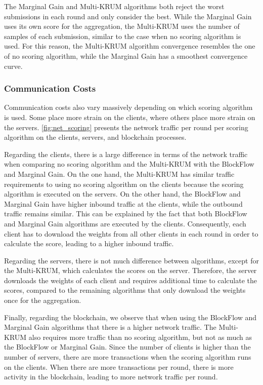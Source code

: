 The Marginal Gain and Multi-KRUM algorithms both reject the worst submissions in each round and only consider the best. While the Marginal Gain uses its own score for the aggregation, the Multi-KRUM uses the number of samples of each submission, similar to the case when no scoring algorithm is used. For this reason, the Multi-KRUM algorithm convergence resembles the one of no scoring algorithm, while the Marginal Gain has a smoothest convergence curve.

\subsubsection{Communication Costs}

Communication costs also vary massively depending on which  scoring algorithm is used. Some place more strain on the clients, where others place more strain on the servers. \autoref{fig:net_scoring} presents the network traffic per round per scoring algorithm on the clients, servers, and blockchain processes.

Regarding the clients, there is a large difference in terms of the network traffic when comparing no scoring algorithm and the Multi-KRUM with the BlockFlow and Marginal Gain. On the one hand, the Multi-KRUM has similar traffic requirements to using no scoring algorithm on the clients because the scoring algorithm is executed on the servers. On the other hand, the BlockFlow and Marginal Gain have higher inbound traffic at the clients, while the outbound traffic remains similar. This can be explained by the fact that both BlockFlow and Marginal Gain algorithms are executed by the clients. Consequently, each client has to download the weights from all other clients in each round in order to calculate the score, leading to a higher inbound traffic.

Regarding the servers, there is not much difference between algorithms, except for the Multi-KRUM, which calculates the scores on the server. Therefore, the server downloads the weights of each client and requires additional time to calculate the scores, compared to the remaining algorithms that only download the weights once for the aggregation.

Finally, regarding the blockchain, we observe that when using the BlockFlow and Marginal Gain algorithms that there is a higher network traffic. The Multi-KRUM also requires more traffic than no scoring algorithm, but not as much as the BlockFlow or Marginal Gain. Since the number of clients is higher than the number of servers, there are more transactions when the scoring algorithm runs on the clients. When there are more transactions per round, there is more activity in the blockchain, leading to more network traffic per round.

